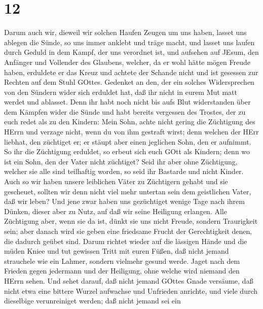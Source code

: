 \hypertarget{section-10}{%
\section{12}\label{section-10}}

 Darum auch wir, dieweil wir solchen Haufen Zeugen um uns
haben, lasset uns ablegen die Sünde, so uns immer anklebt und träge
macht, und lasset uns laufen durch Geduld in dem Kampf, der uns
verordnet ist,  und aufsehen auf JEsum, den Anfänger und
Vollender des Glaubens, welcher, da er wohl hätte mögen Freude haben,
erduldete er das Kreuz und achtete der Schande nicht und ist gesessen
zur Rechten auf dem Stuhl GOttes.  Gedenket an den, der ein
solches Widersprechen von den Sündern wider sich erduldet hat, daß ihr
nicht in eurem Mut matt werdet und ablasset.  Denn ihr habt
noch nicht bis aufs Blut widerstanden über dem Kämpfen wider die Sünde
 und habt bereits vergessen des Trostes, der zu euch redet
als zu den Kindern: Mein Sohn, achte nicht gering die Züchtigung des
HErrn und verzage nicht, wenn du von ihm gestraft wirst; 
denn welchen der HErr liebhat, den züchtiget er; er stäupt aber einen
jeglichen Sohn, den er aufnimmt.  So ihr die Züchtigung
erduldet, so erbeut sich euch GOtt als Kindern; denn wo ist ein Sohn,
den der Vater nicht züchtiget?  Seid ihr aber ohne
Züchtigung, welcher sie alle sind teilhaftig worden, so seid ihr
Bastarde und nicht Kinder.  Auch so wir haben unsere
leiblichen Väter zu Züchtigern gehabt und sie gescheuet, sollten wir
denn nicht viel mehr untertan sein dem geistlichen Vater, daß wir leben?
 Und jene zwar haben uns gezüchtiget wenige Tage nach ihrem
Dünken, dieser aber zu Nutz, auf daß wir seine Heiligung erlangen.
 Alle Züchtigung aber, wenn sie da ist, dünkt sie uns nicht
Freude, sondern Traurigkeit sein; aber danach wird sie geben eine
friedsame Frucht der Gerechtigkeit denen, die dadurch geübet sind.
 Darum richtet wieder auf die lässigen Hände und die müden
Kniee  und tut gewissen Tritt mit euren Füßen, daß nicht
jemand strauchele wie ein Lahmer, sondern vielmehr gesund werde.
 Jaget nach dem Frieden gegen jedermann und der Heiligung,
ohne welche wird niemand den HErrn sehen.  Und sehet
darauf, daß nicht jemand GOttes Gnade versäume, daß nicht etwa eine
bittere Wurzel aufwachse und Unfrieden anrichte, und viele durch
dieselbige verunreiniget werden;  daß nicht jemand sei ein
